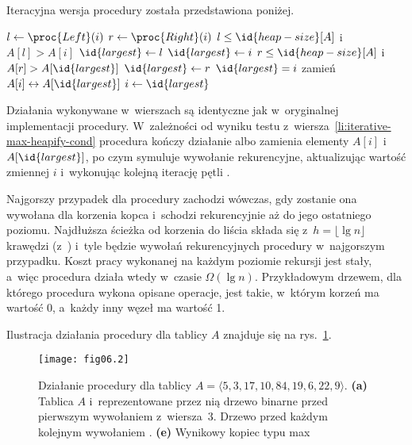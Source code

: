 \exercise %
Iteracyjna wersja procedury  została przedstawiona poniżej.
\begin{codebox}
\li	\While {}
\li		\Do
			$l\gets\proc{Left}(i)$ \label{li:iterative-max-heapify-begin}
\li			$r\gets\proc{Right}(i)$
\li			\If $l\le\id{heap-size}[A]$ i~$A[l]>A[i]$
\li				\Then $\id{largest}\gets l$
\li				\Else $\id{largest}\gets i$
				\End
\li			\If $r\le\id{heap-size}[A]$ i~$A[r]>A[\id{largest}]$
\li				\Then $\id{largest}\gets r$
				\End \label{li:iterative-max-heapify-end}
\li			\If $\id{largest}=i$ \label{li:iterative-max-heapify-cond}
\li				\Then \Return
				\End
\li			zamień $A[i]\leftrightarrow A[\id{largest}]$
\li			$i\gets\id{largest}$
		\End
\end{codebox}
Działania wykonywane w~wierszach \twodashes{\ref{li:iterative-max-heapify-begin}}{\ref{li:iterative-max-heapify-end}} są identyczne jak w~oryginalnej implementacji procedury. W~zależności od wyniku testu z~wiersza~\ref{li:iterative-max-heapify-cond} procedura kończy działanie albo zamienia elementy $A[i]$ i~$A[\id{largest}]$, po czym symuluje wywołanie rekurencyjne, aktualizując wartość zmiennej $i$ i~wykonując kolejną iterację pętli .

\exercise %
Najgorszy przypadek dla procedury  zachodzi wówczas, gdy zostanie ona wywołana dla korzenia kopca i~schodzi rekurencyjnie aż do jego ostatniego poziomu. Najdłuższa ścieżka od korzenia do liścia składa się z~$h=\lfloor\lg n\rfloor$ krawędzi (z~) i~tyle będzie wywołań rekurencyjnych procedury w~najgorszym przypadku. Koszt pracy wykonanej na każdym poziomie rekursji jest stały, a~więc procedura  działa wtedy w~czasie $\Omega(\lg n)$. Przykładowym drzewem, dla którego procedura wykona opisane operacje, jest takie, w~którym korzeń ma wartość 0, a~każdy inny węzeł ma wartość 1.


\exercise %
Ilustracja działania procedury  dla tablicy $A$ znajduje się na rys.~\ref{fig:6.3-1}.
\begin{figure}[ht!]
	\begin{center}
		\texttt{[image: fig06.2]}
	\end{center}
	\caption{Działanie procedury  dla tablicy $A=\langle5,3,17,10,84,19,6,22,9\rangle$. {\sffamily\bfseries(a)} Tablica $A$ i~reprezentowane przez nią drzewo binarne przed pierwszym wywołaniem  z~wiersza~3. {\sffamily\bfseries{}} Drzewo przed każdym kolejnym wywołaniem . {\sffamily\bfseries(e)} Wynikowy kopiec typu max} \label{fig:6.3-1}
\end{figure}

